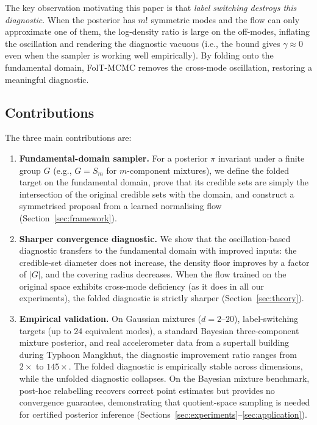 The key observation motivating this paper is that
\emph{label switching destroys this diagnostic}.  When the
posterior has $m!$ symmetric modes and the flow can only
approximate one of them, the log-density ratio is large on the
off-modes, inflating the oscillation and rendering the
diagnostic vacuous (i.e., the bound gives $\gamma \approx 0$
even when the sampler is working well empirically).  By folding
onto the fundamental domain, FolT-MCMC removes the cross-mode
oscillation, restoring a meaningful diagnostic.

\subsection{Contributions}

The three main contributions are:
\begin{enumerate}[nosep]
  \item \textbf{Fundamental-domain sampler.}
  For a posterior $\pi$ invariant under a finite group $G$
  (e.g., $G = S_m$ for $m$-component mixtures), we define
  the folded target on the fundamental domain, prove that its
  credible sets are simply the intersection of the original
  credible sets with the domain, and construct a symmetrised
  proposal from a learned normalising flow
  (Section~\ref{sec:framework}).

  \item \textbf{Sharper convergence diagnostic.}
  We show that the oscillation-based diagnostic transfers
  to the fundamental domain with improved inputs: the
  credible-set diameter does not increase, the density floor
  improves by a factor of $|G|$, and the covering radius
  decreases.  When the flow trained on the original space
  exhibits cross-mode deficiency (as it does in all our
  experiments), the folded diagnostic is strictly sharper
  (Section~\ref{sec:theory}).

  \item \textbf{Empirical validation.}
  On Gaussian mixtures ($d = 2$--$20$), label-switching
  targets (up to $24$ equivalent modes), a standard Bayesian
  three-component mixture posterior, and real accelerometer
  data from a supertall building during Typhoon Mangkhut,
  the diagnostic improvement ratio ranges from $2\times$ to
  $145\times$.  The folded diagnostic is empirically stable
  across dimensions, while the unfolded diagnostic collapses.
  On the Bayesian mixture benchmark, post-hoc relabelling
  recovers correct point estimates but provides no convergence
  guarantee, demonstrating that quotient-space sampling is
  needed for certified posterior inference
  (Sections~\ref{sec:experiments}--\ref{sec:application}).
\end{enumerate}


